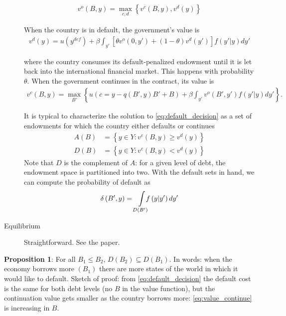 \documentclass[11pt, pdftex]{article}
\begin{document}
\begin{description}
    \begin{align} \label{eq:default_decision}
      v^o\left(B,y \right) = \max_{c,d} \left\{ v^c\left(B,y \right), v^d \left(y \right) \right\}
    \end{align}


    When the country is in default, the government's value is
        \begin{align}
          v^d\left(y \right) = u\left(y^{def} \right) + \beta \int_{y'} \left[\theta v^o\left( 0,y' \right)+\left(1-\theta \right) v^d\left(y' \right)\right]f\left(y'|y \right)dy'
        \end{align}

    where the country consumes its default-penalized endowment until it is let back into the international financial market.  This happens with probability $\theta$. When the government continues in the contract, its value is
    \begin{align} \label{eq:value_continue}
      v^c\left(B,y \right) =\max_{B'} \left \{ u\left(c=y-q\left(B',y \right)B'+B \right) + \beta \int_{y'} v^o\left( B',y' \right)f\left(y'|y \right)dy' \right\}.
    \end{align}

    It is typical to characterize the solution to \eqref{eq:default_decision} as a set of endowments for which the country either defaults or continues
    \begin{align}
      A\left(B \right) &= \left \{ y \in Y: v^c\left(B,y \right) \geq v^d\left(y \right)\right \} \\
      D\left(B \right) &= \left \{ y \in Y: v^c\left(B,y \right) < v^d\left(y \right)\right \}
    \end{align}
    Note that $D$ is the complement of $A$: for a given level of debt, the endowment space is partitioned into two. With the default sets in hand, we can compute the probability of default as
    \begin{align}
      \delta\left(B',y \right) = \int\displaylimits_{D\left(B' \right)} \!\!\! \!f\left(y|y' \right)dy'
    \end{align}
    \item [Equilibrium] Straightforward.  See the paper.
\end{description}

\textbf{Proposition 1}: For all $B_1 \leq B_2$, $D\left(B_2 \right) \subseteq D\left(B_1 \right)$. In words: when the economy borrows more $(B_1)$ there are more states of the world in which it would like to default. Sketch of proof: from \eqref{eq:default_decision} the default cost is the same for both debt levels (no $B$ in the value function), but the continuation value gets smaller as the country borrows more: \eqref{eq:value_continue} is increasing in $B$.
\end{document}
